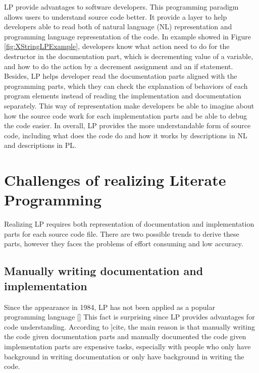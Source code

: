 LP provide advantages to software developers. This programming paradigm allows users to understand source code better. It provide a layer to help developers able to read both of natural language (NL) representation and programming language representation of the code. In example showed in Figure  \ref{fig:XStringLPExample}, developers know what action need to do for the destructor in the documentation part, which is decrementing value of a variable, and how to do the action by a decrement assignment and an if statement. Besides, LP helps developer read the documentation parts aligned with the programming parts, which they can check the explanation of behaviors of each program elements instead of reading the implementation and documentation separately. This way of representation make developers be able to imagine about how the source code work for each implementation parts and be able to debug the code easier. In overall, LP provides the more understandable form of source code, including what does the code do and how it works by descriptions in NL  and descriptions in PL.

\section{Challenges of realizing Literate Programming}
Realizing LP requires both representation of documentation and implementation parts for each source code file. There are two possible trends to derive these parts, however they faces the problems of effort consuming and low accuracy.
 
\subsection{Manually writing documentation and implementation}
Since the appearance in 1984, LP has not been applied as a popular programming language [\cite{LPArticle:MainStream1}] This fact is surprising since LP provides advantages for code understanding. According to ]cite{}, the main reason is that manually writing the code given documentation parts and manually documented the code given implementation parts are expensive tasks, especially with people who only have background in writing documentation or only have background in writing the code. 

